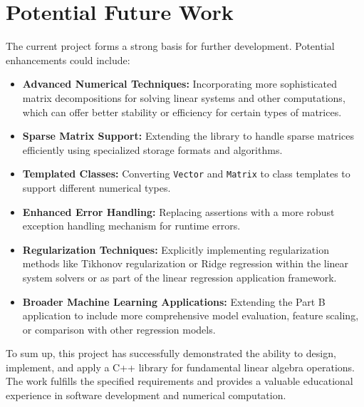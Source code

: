\section{Potential Future Work}
The current project forms a strong basis for further development. Potential enhancements could include:
\begin{itemize}
    \item \textbf{Advanced Numerical Techniques:} Incorporating more sophisticated matrix decompositions for solving linear systems and other computations, which can offer better stability or efficiency for certain types of matrices.
    \item \textbf{Sparse Matrix Support:} Extending the library to handle sparse matrices efficiently using specialized storage formats and algorithms.
    \item \textbf{Templated Classes:} Converting \texttt{Vector} and \texttt{Matrix} to class templates to support different numerical types.
    \item \textbf{Enhanced Error Handling:} Replacing assertions with a more robust exception handling mechanism for runtime errors.
    \item \textbf{Regularization Techniques:} Explicitly implementing regularization methods like Tikhonov regularization or Ridge regression within the linear system solvers or as part of the linear regression application framework.
    \item \textbf{Broader Machine Learning Applications:} Extending the Part B application to include more comprehensive model evaluation, feature scaling, or comparison with other regression models.
\end{itemize}

To sum up, this project has successfully demonstrated the ability to design, implement, and apply a C++ library for fundamental linear algebra operations. The work fulfills the specified requirements and provides a valuable educational experience in software development and numerical computation.